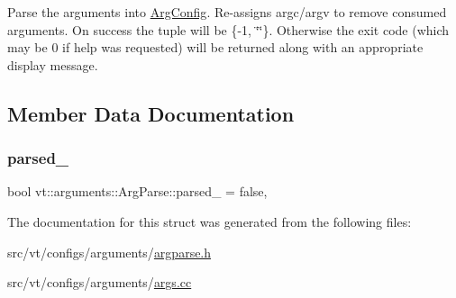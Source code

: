 Parse the arguments into \hyperlink{structvt_1_1arguments_1_1_arg_config}{Arg\+Config}. Re-\/assigns argc/argv to remove consumed arguments. On success the tuple will be \{-\/1, \char`\"{}\char`\"{}\}. Otherwise the exit code (which may be 0 if help was requested) will be returned along with an appropriate display message. 

\subsection{Member Data Documentation}
\mbox{\label{structvt_1_1arguments_1_1_arg_parse_abe793d3075b5e2f794fe08f5e904a2b0}} 
\subsubsection{\texorpdfstring{parsed\+\_\+}{parsed\_}}
{\footnotesize\ttfamily bool vt\+::arguments\+::\+Arg\+Parse\+::parsed\+\_\+ = false\hspace{0.3cm}{\ttfamily [static]}, {\ttfamily [private]}}



The documentation for this struct was generated from the following files\+:\begin{DoxyCompactItemize}
\item 
src/vt/configs/arguments/\hyperlink{argparse_8h}{argparse.\+h}\item 
src/vt/configs/arguments/\hyperlink{args_8cc}{args.\+cc}\end{DoxyCompactItemize}
